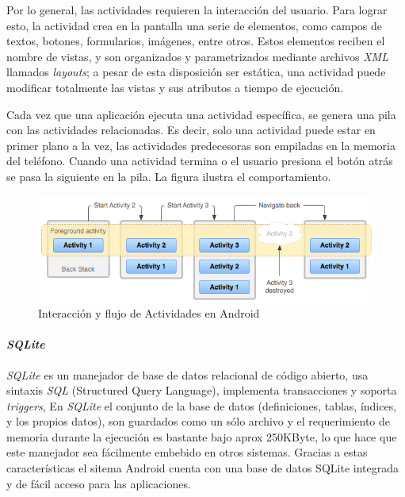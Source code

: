 Por lo general, las actividades requieren la interacción del usuario. Para lograr esto, la actividad crea en la pantalla una serie de elementos, como campos de textos, botones, formularios, imágenes, entre otros. Estos elementos reciben el nombre de vistas, y son organizados y parametrizados mediante archivos \textit{XML} llamados \textit{layouts}; a pesar de esta disposición ser estática, una actividad puede modificar totalmente las vistas y sus atributos a tiempo de ejecución.

Cada vez que una aplicación ejecuta una actividad específica, se genera una pila con las actividades relacionadas. Es decir, solo una actividad puede estar en primer plano a la vez, las actividades predecesoras son empiladas en la memoria del teléfono. Cuando una actividad termina o el usuario presiona el botón atrás se pasa la siguiente en la pila. La figura \cite{fig:backstack} ilustra el comportamiento.

\begin{figure}[h]
	\begin{center}
		\includegraphics[scale=0.6]{imagenes/diagram_backstack.png}
	\end{center}
	\caption{
		\label{fig:backstack}
		Interacción y flujo de Actividades en Android \cite{TBS}
	}
\end{figure}

\paragraph{\textit{SQLite}} 

\textit{SQLite} es un manejador de base de datos relacional de código abierto, usa sintaxis \textit{SQL} (Structured Query Language), implementa transacciones y soporta \textit{triggers}, En \textit{SQLite} el conjunto de la base de datos (definiciones, tablas, índices, y los propios datos), son guardados como un sólo archivo y el requerimiento de memoria durante la ejecución es bastante bajo aprox 250KByte, lo que hace que este manejador sea fácilmente embebido en otros sistemas. Gracias a estas características el sitema Android cuenta con una base de datos SQLite integrada y de fácil acceso para las aplicaciones.

